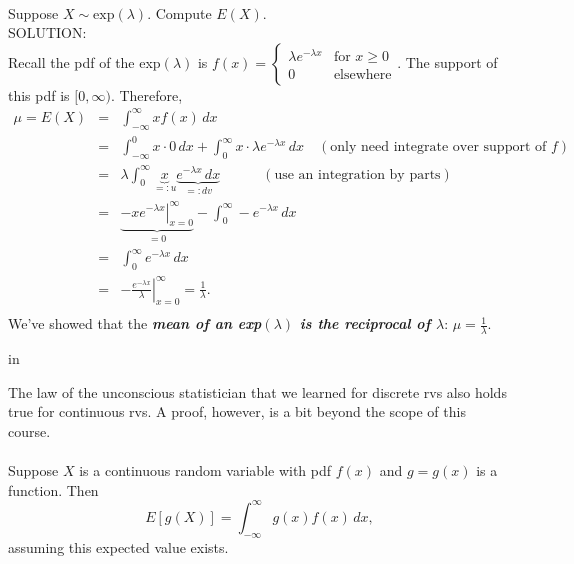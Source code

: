 \documentclass[12pt]{article}
\begin{document}
\newpage





\\
Suppose $X\sim\mbox{exp}(\lambda)$. Compute $E(X)$.\\

\noindent SOLUTION:\\
Recall the pdf of the exp$(\lambda)$ is
$\displaystyle f(x) = \left\{ \begin{array}{cl} \lambda e^{-\lambda x} & \mbox{for }x\ge 0 \\ 0 & \mbox{elsewhere} \end{array} \right..$ The support
of this pdf is $[0,\infty)$. Therefore,
\begin{eqnarray*}
\mu=E(X) &=& \int_{-\infty}^{\infty}xf(x)\,dx \\
&=& \int_{-\infty}^{0}x\cdot 0\,dx + \int_{0}^{\infty}x\cdot \lambda e^{-\lambda x}\,dx \quad (\mbox{only need integrate over support of $f$})\\
&=& \lambda \int_{0}^{\infty}\underbrace{x}_{=:u} \underbrace{e^{-\lambda x}\,dx}_{=:dv}\qquad\quad(\mbox{use an integration by parts})\\
&=& \underbrace{\left. -xe^{-\lambda x}\right|_{x=0}^{\infty}}_{=0} - \int_0^{\infty}-e^{-\lambda x}\,dx\\
&=& \int_0^{\infty}e^{-\lambda x}\,dx \\
&=& \left. - \frac {e^{-\lambda x}}{\lambda}\right|_{x=0}^{\infty} = \frac 1{\lambda}.\\
\end{eqnarray*}
We've showed that the {\bf\em mean of an exp$(\lambda)$ is the reciprocal of $\lambda$}: $\mu=\frac {1}{\lambda}$.




 in


\noindent The law of the unconscious statistician that we learned for discrete rvs also holds true for continuous rvs.
A proof, however, is a bit beyond the scope of this course.\\

\label{lotuscontinuous}\\
Suppose $X$ is a continuous random variable with pdf $f(x)$ and $g=g(x)$ is a function. Then
$$E[g(X)] = \int_{-\infty}^{\infty} g(x)f(x) \,dx,$$
assuming this expected value exists.\\


\newpage
\end{document}
